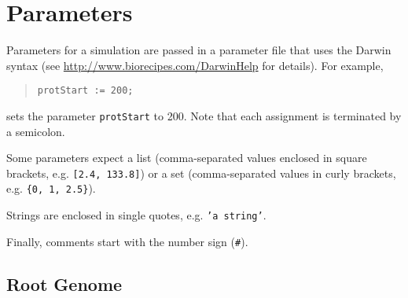 \documentclass[11pt]{article}
\begin{document}
\section{Parameters}
\label{sec.params}
Parameters for a simulation are passed in a parameter file that uses the Darwin syntax (see \url{http://www.biorecipes.com/DarwinHelp} for details). For example,
\begin{quote}
\texttt{protStart := 200;}
\end{quote}
sets the parameter \texttt{protStart} to 200. Note that each assignment is terminated by a semicolon.

Some parameters expect a list (comma-separated values enclosed in square brackets, e.g. \texttt{[2.4, 133.8]}) or a set (comma-separated values in curly brackets, e.g. \texttt{\{0, 1, 2.5\}}).

Strings are enclosed in single quotes, e.g. \texttt{'a string'}.

Finally, comments start with the number sign (\verb|#|).


%
\subsection{Root Genome}
\end{document}
